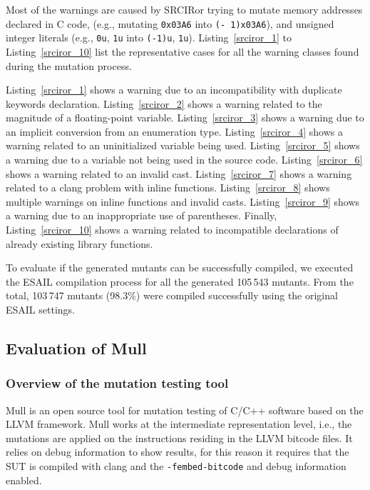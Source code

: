Most of the warnings are caused by SRCIRor trying to mutate memory addresses declared in C code, (e.g., mutating \texttt{0x03A6} into \texttt{(- 1)x03A6}), and unsigned integer literals (e.g., \texttt{0u}, \texttt{1u} into \texttt{(-1)u}, \texttt{1u}).
Listing~\ref{srciror_1} to Listing~\ref{srciror_10} list the representative cases for all the warning classes found during the mutation process. 

Listing~\ref{srciror_1} shows a warning due to an incompatibility with duplicate keywords declaration. 
Listing~\ref{srciror_2} shows a warning related to the magnitude of a floating-point variable. 
Listing~\ref{srciror_3} shows a warning due to an implicit conversion from an enumeration type. 
Listing~\ref{srciror_4} shows a warning related to an uninitialized variable being used. 
Listing~\ref{srciror_5} shows a warning due to a variable not being used in the source code. 
Listing~\ref{srciror_6} shows a warning related to an invalid cast. 
Listing~\ref{srciror_7} shows a warning related to a clang problem with inline functions. 
Listing~\ref{srciror_8} shows multiple warnings on inline functions and invalid casts.
Listing~\ref{srciror_9} shows a warning due to an inappropriate use of parentheses. Finally, Listing~\ref{srciror_10} shows a warning related to incompatible declarations of already existing library functions. 












To evaluate if the generated mutants can be successfully compiled, we executed the ESAIL compilation process for all the generated 105\,543 mutants. From the total, 103\,747 mutants (98.3\%) were compiled successfully using the original ESAIL settings.

\subsection{Evaluation of Mull}
\label{subsec:mull}

\subsubsection{Overview of the mutation testing tool}

Mull is an open source tool for mutation testing of C/C++ software based on the LLVM framework. Mull works at the intermediate representation level, i.e., the mutations are applied on the instructions residing in the LLVM bitcode files. It relies on debug information to show results, for this reason it requires that the SUT is compiled with clang and the \texttt{-fembed-bitcode} and debug information enabled.

